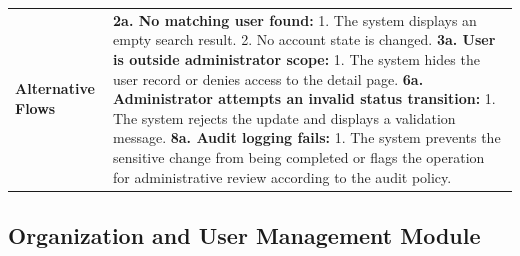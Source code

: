 \begin{longtable}{|>{\raggedright\arraybackslash}p{}|>{\raggedright\arraybackslash}p{}|}
\textbf{Alternative Flows} &
\textbf{2a. No matching user found:} \newline
\hspace*{1em}1. The system displays an empty search result. \newline
\hspace*{1em}2. No account state is changed. \newline
\textbf{3a. User is outside administrator scope:} \newline
\hspace*{1em}1. The system hides the user record or denies access to the detail page. \newline
\textbf{6a. Administrator attempts an invalid status transition:} \newline
\hspace*{1em}1. The system rejects the update and displays a validation message. \newline
\textbf{8a. Audit logging fails:} \newline
\hspace*{1em}1. The system prevents the sensitive change from being completed or flags the operation for administrative review according to the audit policy. \\
\end{longtable}

\subsection{Organization and User Management Module}

